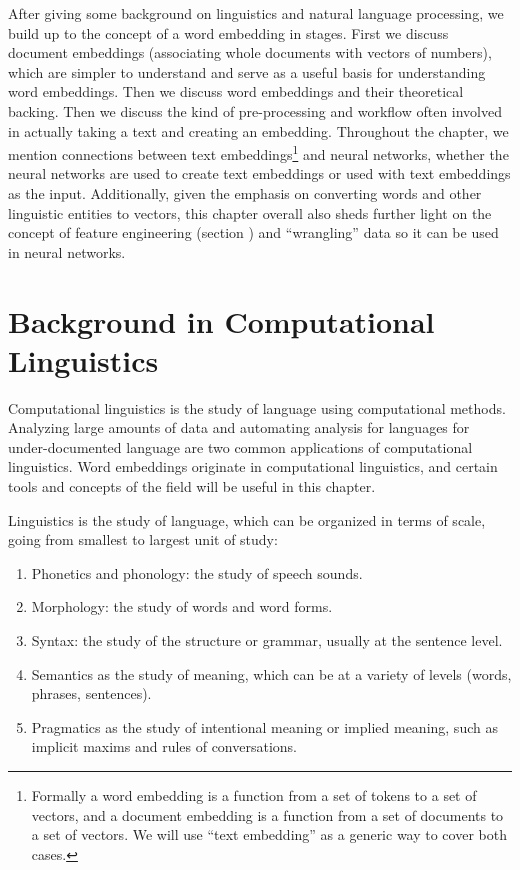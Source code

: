 After giving some background on linguistics and natural language processing, we build up to the concept of a word embedding in stages. First we discuss document embeddings (associating whole documents with vectors of numbers), which are simpler to understand and serve as a useful basis for understanding word embeddings. Then we discuss word embeddings and their theoretical backing.  Then we discuss the kind of pre-processing and workflow often involved in actually taking a text and creating an embedding. Throughout the chapter, we mention connections between text embeddings\footnote{Formally a word embedding is a function from a set of tokens to a set of vectors, and a document embedding is a function from a set of documents to a set of vectors.  We will use ``text embedding'' as a generic way to cover both cases.} and neural networks, whether the neural networks are used to create text embeddings or used with text embeddings as the input.
Additionally, given the emphasis on converting words and other linguistic entities to vectors, this chapter overall also sheds further light on the concept of feature engineering (section ) and ``wrangling'' data so it can be used in neural networks. 

\section{Background in Computational Linguistics}

Computational linguistics is the study of language using computational methods. Analyzing large amounts of data and automating analysis for languages for under-documented language are two common applications of computational linguistics. Word embeddings originate in computational linguistics, and certain tools and concepts of the field will be useful in this chapter. 

Linguistics is the study of language, which can be organized in terms of scale, going from smallest to largest unit of study: 
\begin{enumerate}
\item Phonetics and phonology: the study of speech sounds.
\item Morphology: the study of words and word forms.
\item Syntax: the study of the structure or grammar, usually at the sentence level.
\item Semantics as the study of meaning, which can be at a variety of levels (words, phrases, sentences).
\item Pragmatics as the study of intentional meaning or implied meaning, such as implicit maxims and rules of conversations. 
\end{enumerate}


